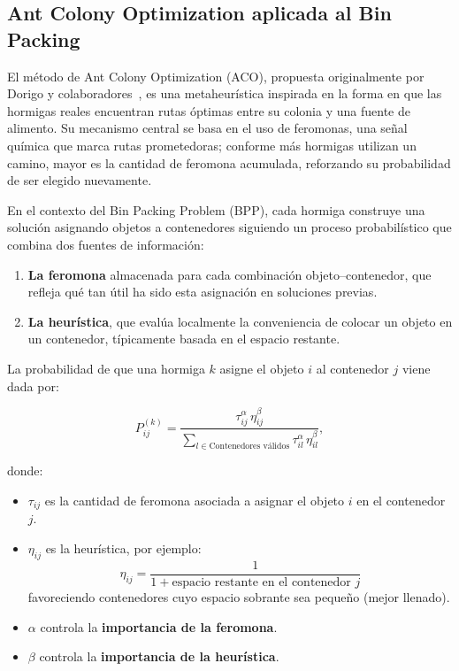 \subsection{Ant Colony Optimization aplicada al Bin Packing}

El método de Ant Colony Optimization (ACO), propuesta originalmente por Dorigo y colaboradores~\cite{dorigo1996ant, dorigo2006ant}, 
es una metaheurística inspirada en la forma en que las hormigas reales encuentran rutas óptimas entre su colonia y una fuente de alimento. 
Su mecanismo central se basa en el uso de feromonas, una señal química que marca rutas prometedoras; conforme más hormigas utilizan un 
camino, mayor es la cantidad de feromona acumulada, reforzando su probabilidad de ser elegido nuevamente.

En el contexto del Bin Packing Problem (BPP), cada hormiga construye una solución asignando objetos a contenedores siguiendo un proceso 
probabilístico que combina dos fuentes de información:

\begin{enumerate}
    \item \textbf{La feromona} almacenada para cada combinación objeto–contenedor, que refleja qué tan útil ha sido esta asignación en 
          soluciones previas.
    \item \textbf{La heurística}, que evalúa localmente la conveniencia de colocar un objeto en un contenedor, típicamente basada en el 
          espacio restante.
\end{enumerate}

La probabilidad de que una hormiga $k$ asigne el objeto $i$ al contenedor $j$ viene dada por:

\begin{equation}
P_{ij}^{(k)} = 
\frac{\tau_{ij}^{\alpha} \, \eta_{ij}^{\beta}}
{\sum\limits_{l \in \text{Contenedores válidos}} \tau_{il}^{\alpha} \, \eta_{il}^{\beta}},
\label{eq:probabilidad}
\end{equation}

donde:

\begin{itemize}
    \item $\tau_{ij}$ es la cantidad de feromona asociada a asignar el objeto $i$ en el contenedor $j$.
    \item $\eta_{ij}$ es la heurística, por ejemplo: 
    \begin{equation}\label{eq: heuristica}
    \eta_{ij} = \frac{1}{1 + \text{espacio restante en el contenedor } j}
    \end{equation}
    favoreciendo contenedores cuyo espacio sobrante sea pequeño (mejor llenado).
    \item $\alpha$ controla la \textbf{importancia de la feromona}.  
    \item $\beta$ controla la \textbf{importancia de la heurística}.  
\end{itemize}

